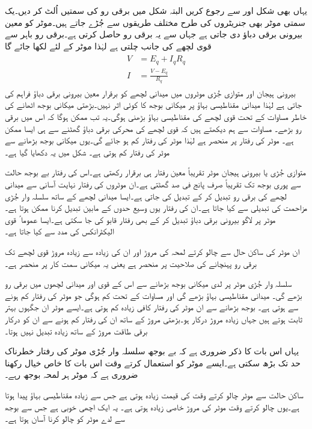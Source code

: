 یہاں بھی شکل  اور  سے رجوع کریں البتہ شکل میں برقی رو کی سمتیں اُلٹ کر دیں۔یک سمتی موٹر بھی جنریٹروں کی طرح مختلف طریقوں سے جُڑے جاتے ہیں۔موٹر کو معین بیرونی برقی دباؤ دی جاتی ہے جہاں سے یہ برقی رو حاصل کرتی ہے۔برقی رو باہر سے قوی لچھے کی جانب چلتی ہے لہٰذا موٹر کے لئے لکھا جائے گا
\begin{gather}
\begin{aligned}
V&=E_q+I_q R_q\\
I&=\frac{V-E_q}{R_q}
\end{aligned}
\end{gather}
بیرونی ہیجان اور متوازی جُڑی موٹروں میں میدانی لچھے کو برقرار معین بیرونی برقی دباؤ فراہم کی جاتی ہے لہٰذا میدانی مقناطیسی بہاؤ پر میکانی بوجھ کا کوئی اثر نہیں۔بڑھتی میکانی بوجھ اٹھانے کی خاطر مساوات   کے تحت قوی لچھے کی مقناطیسی بہاؤ بڑھنی ہوگی۔یہ تب ممکن ہوگا کہ اس میں برقی رو بڑھے۔ مساوات  سے ہم دیکھتے ہیں کہ قوی لچھے کی محرکی برقی دباؤ   گھٹنے سے ہی ایسا ممکن ہے۔ موٹر کی رفتار پر منحصر ہے لہٰذا موٹر کی رفتار کم ہو جائے گی۔یوں میکانی بوجھ بڑھانے سے موٹر کی رفتار کم ہوتی ہے۔ شکل   میں یہ دکھایا گیا ہے۔

متوازی جُڑی یا بیرونی ہیجان موٹر تقریباً معین رفتار ہی برقرار رکھتی ہے۔اس کی رفتار بے بوجھ حالت سے پوری بوجھ تک تقریباً صرف پانج فی صد گھٹتی ہے۔ان موٹروں کی رفتار نہایت آسانی سے میدانی لچھے کی برقی رو تبدیل کر کے تبدیل کی جاتی ہے۔ایسا میدانی لچھے کے ساتھ سلسلہ وار جُڑی مزاحمت کی تبدیلی سے کیا جاتا ہے۔ان کی رفتار یوں وسیع حدوں کے مابین تبدیل کرنا ممکن ہوتا ہے۔موٹر پر لاگو بیرونی برقی دباؤ تبدیل کر کے بھی رفتار قابو کی جا سکتی ہے۔ایسا عموما ً قوی الیکٹرانکس کی مدد سے کیا جاتا ہے۔

ان موٹر کی ساکن حال سے چالو کرتے لمحہ کی مروڑ اور ان کی زیادہ سے زیادہ مروڑ قوی لچھے تک برقی رو پہنچانے کی صلاحیت پر منحصر ہے یعنی یہ میکانی سمت کار پر منحصر ہے۔

سلسلہ وار جُڑی موٹر پر لدی میکانی بوجھ بڑھانے سے اس کے قوی اور میدانی لچھوں میں برقی رو بڑھے گی۔ میدانی مقناطیسی بہاؤ بڑھے گی اور مساوات  کے تحت  کم ہوگی جو موٹر کی رفتار کم ہونے سے ہوتی ہے۔ بوجھ بڑھانے سے ان موٹر کی رفتار کافی زیادہ کم ہوتی ہے۔ایسے موٹر ان جگہوں بہتر ثابت ہوتے ہیں جہاں زیادہ مروڑ درکار ہو۔بڑھتی مروڑ کے ساتھ ان کی رفتار کم ہونے سے ان کو درکار برقی طاقت مروڑ کے ساتھ زیادہ تبدیل نہیں ہوتا۔

یہاں اس بات کا ذکر ضروری ہے کہ بے بوجھ سلسلہ وار جُڑی موٹر کی رفتار خطرناک حد تک بڑھ سکتی ہے۔ایسے موٹر کو استعمال کرتے وقت اس بات کا خاص خیال رکھنا ضروری ہے کہ موٹر ہر لمحہ بوجھ رہے۔

ساکن حالت سے موٹر چالو کرتے وقت    کی قیمت زیادہ ہوتی ہے جس سے زیادہ  مقناطیسی بہاؤ پیدا ہوتا ہے۔یوں چالو کرتے وقت موٹر کی مروڑ خاصی زیادہ ہوتی ہے۔ یہ ایک اچھی خوبی ہے جس سے بوجھ سے لدے  موٹر کو چالو کرنا آسان ہوتا ہے۔


